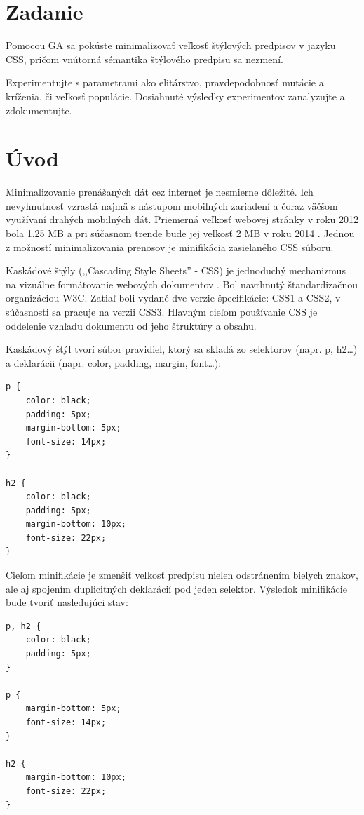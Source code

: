 \section{Zadanie}

Pomocou GA sa pokúste minimalizovať veľkosť štýlových predpisov v jazyku CSS, pričom vnútorná sémantika štýlového predpisu sa nezmení. 

Experimentujte s parametrami ako elitárstvo, pravdepodobnosť mutácie a kríženia, či veľkosť populácie. Dosiahnuté výsledky experimentov zanalyzujte a zdokumentujte.

\section{Úvod} %
\label{sec:_vod}
Minimalizovanie prenášaných dát cez internet je nesmierne dôležité. Ich nevyhnutnosť vzrastá najmä s nástupom mobilných zariadení a čoraz väčšom využívaní drahých mobilných dát. Priemerná veľkosť webovej stránky v roku 2012 bola 1.25 MB a pri súčasnom trende bude jej veľkosť 2 MB v roku 2014 \cite{size}. Jednou z možností minimalizovania prenosov je minifikácia zasielaného CSS súboru.

Kaskádové štýly (,,Cascading Style Sheets'' - CSS) je jednoduchý mechanizmus na vizuálne formátovanie webových dokumentov \cite{css}. Bol navrhnutý štandardizačnou organizáciou W3C. Zatiaľ boli vydané dve verzie špecifikácie: CSS1 a CSS2, v súčasnosti sa pracuje na verzii CSS3. Hlavným cieľom používanie CSS je oddelenie vzhľadu dokumentu od jeho štruktúry a obsahu.

Kaskádový štýl tvorí súbor pravidiel, ktorý sa skladá zo selektorov (napr. p, h2\ldots) a deklarácii (napr. color, padding, margin, font\ldots):

\begin{verbatim}
p { 
    color: black; 
    padding: 5px;
    margin-bottom: 5px;
    font-size: 14px;
}

h2 {
    color: black; 
    padding: 5px;
    margin-bottom: 10px;
    font-size: 22px;
}
\end{verbatim}

Cieľom minifikácie je zmenšiť veľkosť predpisu nielen odstránením bielych znakov, ale aj spojením duplicitných deklarácií pod jeden selektor. Výsledok minifikácie bude tvoriť nasledujúci stav:

\begin{verbatim}
p, h2 {
    color: black; 
    padding: 5px;
}

p {
    margin-bottom: 5px;
    font-size: 14px;
}

h2 {
    margin-bottom: 10px;
    font-size: 22px;
}
\end{verbatim}

